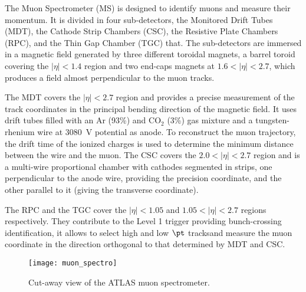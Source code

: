 The Muon Spectrometer (MS) is designed to identify muons and measure their
momentum. It is divided in four sub-detectors, the Monitored Drift Tubes (MDT),
the Cathode Strip Chambers (CSC), the Resistive Plate Chambers (RPC), and the
Thin Gap Chamber (TGC) that. The sub-detectors are immersed in a magnetic field
generated by three different toroidal magnets, a barrel toroid covering the
$|\eta| < 1.4$ region and two end-caps magnets at $1.6 < |\eta| < 2.7$, which
produces a field almost perpendicular to the muon tracks.

The MDT covers the $|\eta| < 2.7$ region and provides a precise measurement of
the track coordinates in the principal bending direction of the magnetic
field. It uses drift tubes filled with an Ar (93\%) and CO$_2$ (3\%) gas mixture
and a tungsten-rhenium wire at 3080~V potential as anode. To reconstruct the
muon trajectory, the drift time of the ionized charges is used to determine the
minimum distance between the wire and the muon. The CSC covers the $2.0 < |\eta|
< 2.7$ region and is a multi-wire proportional chamber with cathodes segmented in
strips, one perpendicular to the anode wire, providing the precision coordinate,
and the other parallel to it (giving the transverse coordinate).


The RPC and the TGC cover the $|\eta| < 1.05$ and $1.05 < |\eta| < 2.7$ regions
respectively. They contribute to the Level 1 trigger providing bunch-crossing
identification, it allows to select high and low $\pt$ tracksand measure the
muon coordinate in the direction orthogonal to that determined by MDT and CSC.

\begin{figure}[!h]
  \centering
    \texttt{[image: muon\_spectro]}
    \caption{Cut-away view of the ATLAS muon spectrometer.}
    \label{fig:muon_spectro}
\end{figure}
